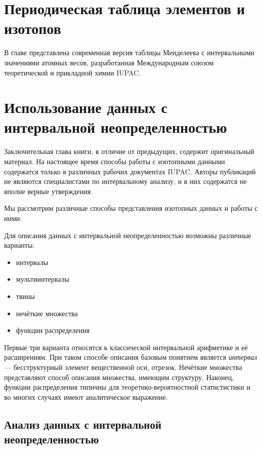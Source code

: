 \documentclass[a5paper,openany]{book}
\begin{document}
			
			\chapter{Периодическая таблица элементов и изотопов} 
			
			В главе представлена современная версия таблицы Менделеева с интервальными значениями атомных весов, разработанная Международным союзом теоретической и прикладной химии IUPAC. 
			
			\chapter{Использование  данных с интервальной неопределенностью}
			
			Заключительная глава книги, в отличие от предыдущих, содержит оригинальный материал.
			На настоящее время способы работы с изотопными данными содержатся только в различных рабочих документах IUPAC.  Авторы публикаций не являются специалистами по интервальному анализу, и в них содержатся не вполне верные утверждения.
			
			Мы рассмотрим различные способы представления изотопных данных и работы с ними.
			
			Для описания данных с интервальной неопределенностью возможны различные варианты.          
			\begin{itemize}
				\item интервалы
				\item мультиинтервалы
				\item твины
				\item нечёткие множества
				\item функции распределения
			\end{itemize}
			Первые три варианта относятся к классической интервальной арифметике и её расширениям. При таком способе описания базовым понятием является \emph{интервал}  --- бесструктурный элемент вещественной оси, отрезок. Нечёткие множества представляют способ описания множества, имеющим структуру.  Наконец, функции распределения типичны для теоретико-вероятностной статистистики и во многих случаях имеют аналитическое выражение.           
			
			\section{Анализ данных с интервальной неопределенностью}
			
\end{document}
